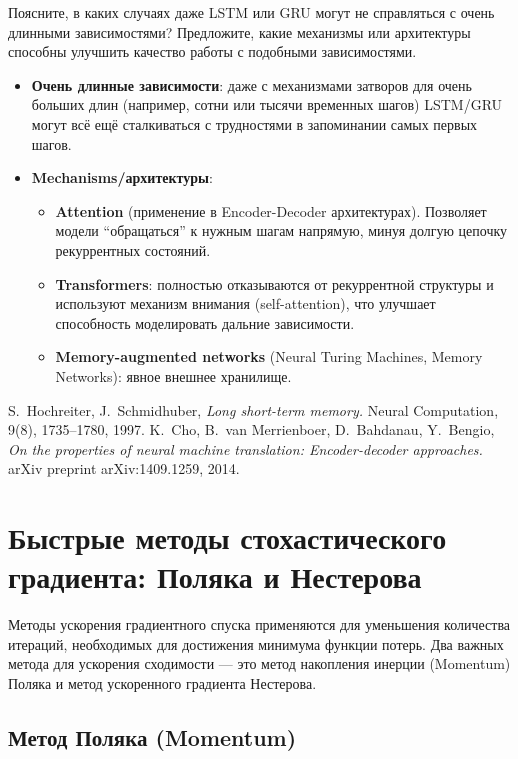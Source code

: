 Поясните, в каких случаях даже LSTM или GRU могут не справляться с очень длинными зависимостями? Предложите, какие механизмы или архитектуры способны улучшить качество работы с подобными зависимостями.

\begin{itemize}
    \item \textbf{Очень длинные зависимости}: даже с механизмами затворов для очень больших длин (например, сотни или тысячи временных шагов) LSTM/GRU могут всё ещё сталкиваться с трудностями в запоминании самых первых шагов. 
    \item \textbf{Mechanisms/архитектуры}: 
    \begin{itemize}
        \item \textbf{Attention} (применение в Encoder-Decoder архитектурах). Позволяет модели ``обращаться'' к нужным шагам напрямую, минуя долгую цепочку рекуррентных состояний.
        \item \textbf{Transformers}: полностью отказываются от рекуррентной структуры и используют механизм внимания (self-attention), что улучшает способность моделировать дальние зависимости.
        \item \textbf{Memory-augmented networks} (Neural Turing Machines, Memory Networks): явное внешнее хранилище.
    \end{itemize}
\end{itemize} 

\begin{thebibliography}{99}
 S.~Hochreiter, J.~Schmidhuber, \textit{Long short-term memory.} Neural Computation, 9(8), 1735--1780, 1997.
 K.~Cho, B.~van Merrienboer, D.~Bahdanau, Y.~Bengio, \textit{On the properties of neural machine translation: Encoder-decoder approaches.} arXiv preprint arXiv:1409.1259, 2014.
\end{thebibliography}

\section*{Быстрые методы стохастического градиента: Поляка и Нестерова}

Методы ускорения градиентного спуска применяются для уменьшения количества итераций, необходимых для достижения минимума функции потерь. Два важных метода для ускорения сходимости — это метод накопления инерции (Momentum) Поляка и метод ускоренного градиента Нестерова.


\subsection*{Метод Поляка (Momentum)}

